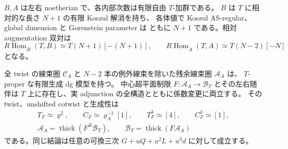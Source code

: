 \begin{proposition}[有限中心性を用いない相対線束模型]
\label{lcc:prop:universal-line-model}
$B,A$ は左右 noetherian で、各内部次数は有限自由 $T$-加群である。
$B$ は $T$ に相対的な長さ $N+1$ の有限 Koszul 解消を持ち、
各体値で Koszul AS-regular、global dimension と Gorenstein parameter は
ともに $N+1$ である。相対 augmentation 双対は
\[
 R\underline{\operatorname{Hom}}_B(T,B)\simeq T(N+1)[-(N+1)],
 \qquad
 R\underline{\operatorname{Hom}}_A(T,A)\simeq T(N-2)[-N]
\]
となる。

全 twist の線束圏 $\mathcal C_A$ と
$N-2$ 本の例外線束を除いた残余線束圏 $\mathcal A_A$ は、
$T$-proper な有限生成 dg 模型を持つ。
中心超平面制限 $F:\mathcal A_A\to\mathcal B_T$ とその左右随伴は
$T$ 上に存在し、実 adjunction の全構造とともに係数変更に両立する。
その twist、unshifted cotwist と生成性は
\begin{gather*}
 T_F\simeq\varrho^2,\qquad C_F\simeq\varrho_A^{-1}[1],\qquad
 T_F^3\simeq[4],\qquad C_F^3\simeq[1],\\
 \mathcal A_A=\operatorname{thick}(F^R\mathcal B_T),\qquad
 \mathcal B_T=\operatorname{thick}(F\mathcal A_A)
\end{gather*}
である。同じ結論は任意の可換三次
$G+uQ+u^2L+u^3d$ に対して成立する。
\end{proposition}

